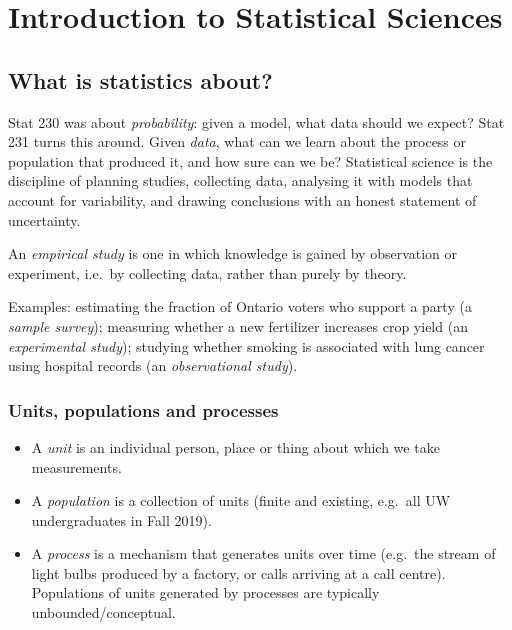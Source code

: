 \chapter{Introduction to Statistical Sciences}

\section{What is statistics about?}

Stat 230 was about \emph{probability}: given a model, what data should we expect? Stat 231
turns this around. Given \emph{data}, what can we learn about the process or population
that produced it, and how sure can we be? Statistical science is the discipline of
planning studies, collecting data, analysing it with models that account for variability,
and drawing conclusions with an honest statement of uncertainty.

\begin{definition}
An \emph{empirical study} is one in which knowledge is gained by observation or
experiment, i.e.\ by collecting data, rather than purely by theory.
\end{definition}

Examples: estimating the fraction of Ontario voters who support a party (a \emph{sample
survey}); measuring whether a new fertilizer increases crop yield (an \emph{experimental
study}); studying whether smoking is associated with lung cancer using hospital records
(an \emph{observational study}).

\subsection{Units, populations and processes}

\begin{definition}
\begin{itemize}
  \item A \emph{unit} is an individual person, place or thing about which we take
        measurements.
  \item A \emph{population} is a collection of units (finite and existing, e.g.\ all
        UW undergraduates in Fall 2019).
  \item A \emph{process} is a mechanism that generates units over time (e.g.\ the
        stream of light bulbs produced by a factory, or calls arriving at a call centre).
        Populations of units generated by processes are typically unbounded/conceptual.
\end{itemize}
\end{definition}

